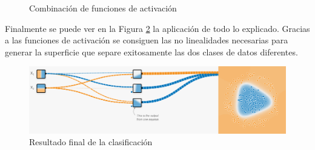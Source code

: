 \begin{itemize}
    \vspace*{5pt}
    \begin{figure}[h!]
        \centering
            \qquad
        \caption{Combinación de funciones de activación}
        \label{combinacion_sigmoid}
    \end{figure}
    
    Finalmente se puede ver en la Figura \ref{clasificacion_activacion} la aplicación de todo lo explicado. Gracias a las funciones de activación se consiguen las no linealidades necesarias para generar la superficie que separe exitosamente las dos clases de datos diferentes. 
    
    \vspace*{5pt}
    \begin{figure}[h!]
        \centering
        \includegraphics[width=135mm, angle=0]{2/Fotos/clasificacion_activacion.png}
        \captionsetup{justification=centering,margin=1.25cm}
        \caption{Resultado final de la clasificación}
        \label{clasificacion_activacion}
    \end{figure}
    

\end{itemize}
